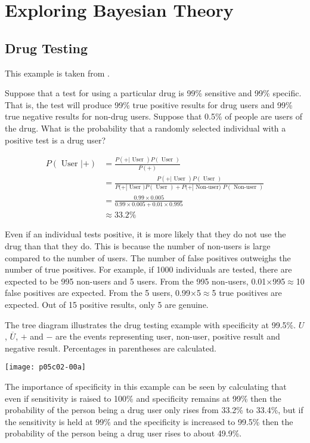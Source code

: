 
\chapter{Exploring Bayesian Theory}
\label{chap:ExploringBayesianTheory}

\section{Drug Testing}
\label{sec:drugtesting}
This example is taken from \cite{WikiPediaBayesTtheorem2019}.

Suppose that a test for using a particular drug is 99\% sensitive and 99\% specific. That is, the test will produce 99\% true positive results for drug users and 99\% true negative results for non-drug users. Suppose that 0.5\% of people are users of the drug. What is the probability that a randomly selected individual with a positive test is a drug user?

\begin{equation}
\begin{aligned} P(\text { User } |+) &=\frac{P(+| \text { User }) P(\text { User })}{P(+)} \\ &=\frac{P(+| \text { User }) P(\text { User })}{P(+| \text { User }) P(\text { User })+P(+| \text { Non-user) } P(\text { Non-user })} \\ &=\frac{0.99 \times 0.005}{0.99 \times 0.005+0.01 \times 0.995} \\ & \approx 33.2 \% \end{aligned}
\end{equation}

Even if an individual tests positive, it is more likely that they do not use the drug than that they do. This is because the number of non-users is large compared to the number of users. The number of false positives outweighs the number of true positives. For example, if 1000 individuals are tested, there are expected to be 995 non-users and 5 users. From the 995 non-users, 0.01$\times$995$\approx$10 false positives are expected. From the 5 users, 0.99$\times$5$\approx$5 true positives are expected. Out of 15 positive results, only 5 are genuine.

The tree diagram illustrates the drug testing example with specificity at 99.5\%. $U$, $\overline{U}$, $+$ and $-$ are the events representing user, non-user, positive result and negative result. Percentages in parentheses are calculated.
\begin{marginfigure}
\texttt{[image: p05c02-00a]}
\end{marginfigure}
The importance of specificity in this example can be seen by calculating that even if sensitivity is raised to 100\% and specificity remains at 99\% then the probability of the person being a drug user only rises from 33.2\% to 33.4\%, but if the sensitivity is held at 99\% and the specificity is increased to 99.5\% then the probability of the person being a drug user rises to about 49.9\%.




